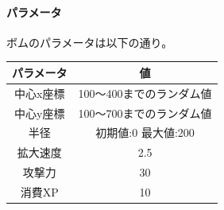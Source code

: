\documentclass[a4paper,titlepage,11pt]{ltjsarticle}
\begin{document}
\paragraph{パラメータ}
ボムのパラメータは以下の通り。
\begin{table}[H]
	\centering
	\begin{tabular}{|c|c|}
		\hline
		パラメータ & 値\\ \hline \hline
		中心x座標 & 100～400までのランダム値\\ \hline
		中心y座標 & 100～700までのランダム値\\ \hline
		半径 & 初期値:0 最大値:200\\ \hline
		拡大速度 & 2.5\\ \hline
		攻撃力 & 30\\ \hline
		消費XP & 10\\ \hline
	\end{tabular}
\end{table}
\end{document}

